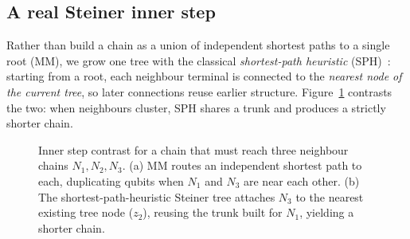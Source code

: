 \documentclass[acmsmall,anonymous,nonacm]{acmart}
\begin{document}
\subsection{A real Steiner inner step}
\label{sec:steiner}
Rather than build a chain as a union of independent shortest paths to a single
root (MM), we grow one tree with the classical \emph{shortest-path heuristic}
(SPH)~\cite{takahashi1980sph,mehlhorn1988steiner}: starting from a root, each
neighbour terminal is connected to the \emph{nearest node of the current tree},
so later connections reuse earlier structure. Figure~\ref{fig:steiner}
contrasts the two: when neighbours cluster, SPH shares a trunk and produces a
strictly shorter chain.

\begin{figure}[t]
\centering
{}
\caption{Inner step contrast for a chain that must reach three neighbour chains
$N_1,N_2,N_3$. (a) MM routes an independent shortest path to each, duplicating
qubits when $N_1$ and $N_3$ are near each other. (b) The shortest-path-heuristic
Steiner tree attaches $N_3$ to the nearest existing tree node ($z_2$), reusing
the trunk built for $N_1$, yielding a shorter chain.}
\label{fig:steiner}
\end{figure}
\end{document}
